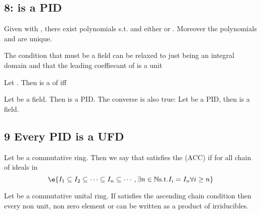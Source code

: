 \begin{Le}
\subsection{8:  is a PID}
\begin{T} Given  with , there exist polynomials  s.t.  and either  or . Moreover the polynomials  and  are unique.\end{T}


\begin{T} The condition that  must be a field can be relaxed to  just being an integral domain and that the leading coeffiecant of  is a unit \end{T}

\begin{C} Let . Then  is a  of  iff  \end{C}

\begin{T} Let  be a field. Then  is a PID. The converse is also true: Let  be a PID, then  is a field. \end{T}

\subsection{9 Every PID is a UFD}

\begin{D} Let  be a commutative ring. Then we say that  satisfies the  (ACC) if for all chain of ideals in 
$$\e{I_1\subseteq I_2 \subseteq \cdots \subseteq I_n \subseteq \cdots, \exists n\in \mathbb{N} \text{s.t.} I_i=I_n \forall i\geq n}$$
\end{D}

\begin{Le} Let  be a commutative unital ring. If  satisfies the ascending chain condition then every non unit, non zero element or  can be written as a product of irriducibles. \end{Le}


\end{Le}
